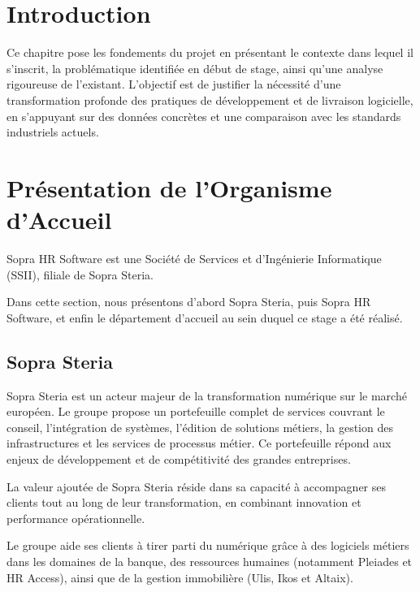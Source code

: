 
\section*{Introduction}

Ce chapitre pose les fondements du projet en présentant le contexte dans lequel il s'inscrit,
la problématique identifiée en début de stage, ainsi qu'une analyse rigoureuse de l'existant.
L'objectif est de justifier la nécessité d'une transformation profonde des pratiques de
développement et de livraison logicielle, en s'appuyant sur des données concrètes et une
comparaison avec les standards industriels actuels.


\section{Présentation de l'Organisme d'Accueil}

Sopra HR Software est une Société de Services et d'Ingénierie Informatique (SSII), filiale de
Sopra Steria.

Dans cette section, nous présentons d'abord Sopra Steria, puis Sopra HR Software, et
enfin le département d'accueil au sein duquel ce stage a été réalisé.

\subsection{Sopra Steria}

Sopra Steria est un acteur majeur de la transformation numérique sur le marché européen.
Le groupe propose un portefeuille complet de services couvrant le conseil, l'intégration de
systèmes, l'édition de solutions métiers, la gestion des infrastructures et les services de
processus métier. Ce portefeuille répond aux enjeux de développement et de compétitivité
des grandes entreprises.

La valeur ajoutée de Sopra Steria réside dans sa capacité à accompagner ses clients tout au
long de leur transformation, en combinant innovation et performance opérationnelle.

Le groupe aide ses clients à tirer parti du numérique grâce à des logiciels métiers dans les
domaines de la banque, des ressources humaines (notamment Pleiades et HR Access), ainsi
que de la gestion immobilière (Ulis, Ikos et Altaix).

